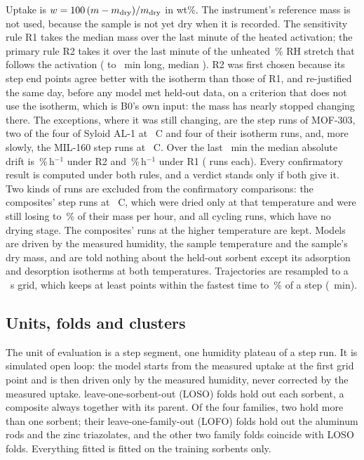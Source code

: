 \documentclass[12pt]{article}
\begin{document}
Uptake is $w = 100\,(m - m_{\mathrm{dry}})/m_{\mathrm{dry}}$ in wt\%. The instrument's reference mass is not
used, because the sample is not yet dry when it is recorded. The sensitivity rule R1 takes the median mass over the
last minute of the heated activation; the primary rule R2 takes it over the last minute of the unheated
\,\% RH stretch that follows the activation ( to ~min long, median
). R2 was first chosen because its step end points agree better with the isotherm than those of R1, and
re-justified the same day, before any model met held-out data, on a criterion that does not use the isotherm, which
is B0's own input: the mass has nearly stopped changing there. The exceptions, where it was still changing, are the
step runs of MOF-303, two of the four of Syloid AL-1 at ~\textdegree C and four of their isotherm runs, and,
more slowly, the MIL-160 step runs at ~\textdegree C. Over the last ~min the median absolute drift is
\,\%\,h$^{-1}$ under R2 and \,\%\,h$^{-1}$ under R1 ( runs
each). Every confirmatory result is computed under both rules, and a verdict stands only if both give it. Two kinds of runs are
excluded from the confirmatory comparisons: the composites' step runs at ~\textdegree C, which were dried
only at that temperature and were still losing  to \,\% of their mass per hour, and all
cycling runs, which have no drying stage. The composites' runs at the higher temperature are kept. Models are driven by the measured humidity, the sample temperature and the sample's dry
mass, and are told nothing about the held-out sorbent except its adsorption and desorption isotherms at both
temperatures. Trajectories are resampled to a ~s grid, which keeps at least  points within
the fastest time to \,\% of a step (~min).

\subsection{Units, folds and clusters}

The unit of evaluation is a step segment, one humidity plateau of a step run. It is simulated open loop: the model
starts from the measured uptake at the first grid point and is then driven only by the measured humidity, never
corrected by the measured uptake.  leave-one-sorbent-out (LOSO) folds hold out each sorbent, a
composite always together with its parent. Of the four families, two hold more than one sorbent; their
leave-one-family-out (LOFO) folds hold out the aluminum rods and the zinc triazolates, and the other two family folds
coincide with LOSO folds. Everything fitted is fitted on the training
sorbents only.
\end{document}
